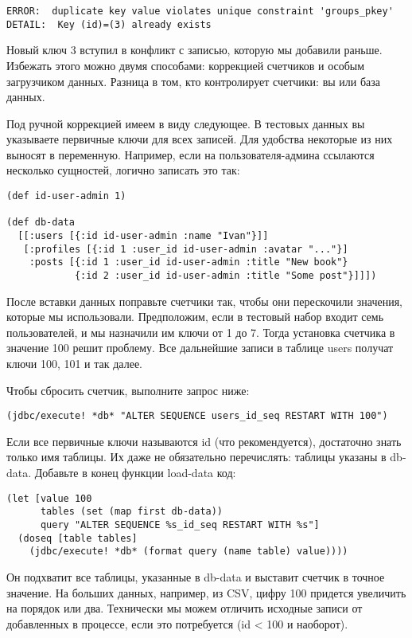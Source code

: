 \begin{verbatim}
ERROR:  duplicate key value violates unique constraint 'groups_pkey'
DETAIL:  Key (id)=(3) already exists
\end{verbatim}

Новый ключ 3 вступил в конфликт с записью, которую мы добавили раньше. Избежать
этого можно двумя способами: коррекцией счетчиков и особым загрузчиком
данных. Разница в том, кто контролирует счетчики: вы или база данных.

Под ручной коррекцией имеем в виду следующее. В тестовых данных вы указываете
первичные ключи для всех записей. Для удобства некоторые из них выносят в
переменную. Например, если на пользователя-админа ссылаются несколько сущностей,
логично записать это так:

\begin{verbatim}
(def id-user-admin 1)

(def db-data
  [[:users [{:id id-user-admin :name "Ivan"}]]
   [:profiles [{:id 1 :user_id id-user-admin :avatar "..."}]
    :posts [{:id 1 :user_id id-user-admin :title "New book"}
            {:id 2 :user_id id-user-admin :title "Some post"}]]])
\end{verbatim}

После вставки данных поправьте счетчики так, чтобы они перескочили значения,
которые мы использовали. Предположим, если в тестовый набор входит семь
пользователей, и мы назначили им ключи от 1 до 7. Тогда установка счетчика в
значение 100 решит проблему. Все дальнейшие записи в таблице users получат ключи
100, 101 и так далее.

Чтобы сбросить счетчик, выполните запрос ниже:

\begin{verbatim}
(jdbc/execute! *db* "ALTER SEQUENCE users_id_seq RESTART WITH 100")
\end{verbatim}

Если все первичные ключи называются id (что рекомендуется), достаточно знать
только имя таблицы. Их даже не обязательно перечислять: таблицы указаны в
db-data. Добавьте в конец функции load-data код:

\begin{verbatim}
(let [value 100
      tables (set (map first db-data))
      query "ALTER SEQUENCE %s_id_seq RESTART WITH %s"]
  (doseq [table tables]
    (jdbc/execute! *db* (format query (name table) value))))
\end{verbatim}

Он подхватит все таблицы, указанные в db-data и выставит счетчик в точное
значение. На больших данных, например, из CSV, цифру 100 придется увеличить на
порядок или два. Технически мы можем отличить исходные записи от добавленных в
процессе, если это потребуется (id < 100 и наоборот).

